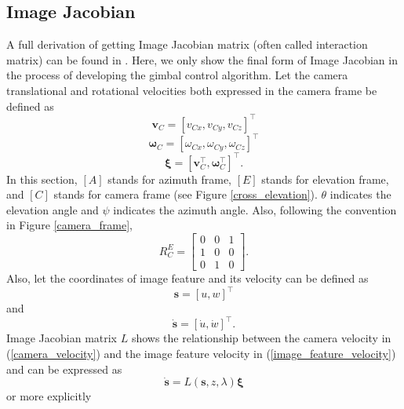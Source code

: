 \subsection{Image Jacobian}
A full derivation of getting Image Jacobian matrix (often called interaction matrix) can be found in \cite{spong2006robot}. Here, we only show the final form of Image Jacobian in the process of developing the gimbal control algorithm. Let the camera translational and rotational velocities both expressed in the camera frame be defined as
\begin{equation}
\mathbf{v}_C=[v_{Cx}, v_{Cy}, v_{Cz}]^\top
\end{equation}
\begin{equation}
\mathbf{\omega}_C=[\omega_{Cx}, \omega_{Cy}, \omega_{Cz}]^\top
\end{equation}
\begin{equation}
\mathbf{\xi}=[\mathbf{v}_C^\top, \mathbf{\omega}_C^\top]^\top.
\label{camera_velocity}
\end{equation}
In this section, $[A]$ stands for azimuth frame, $[E]$ stands for elevation frame, and $[C]$ stands for camera frame (see Figure \ref{cross_elevation}). $\theta$ indicates the elevation angle and $\psi$ indicates the azimuth angle. Also, following the convention in Figure \ref{camera_frame}, 
\begin{equation}
R^{E}_C =
\begin{bmatrix}
0 & 0 & 1 \\
1 & 0 & 0 \\
0 & 1 & 0
\end{bmatrix}.
\end{equation}
Also, let the coordinates of image feature and its velocity can be defined as 
\begin{equation}
\mathbf{s}=[u, w]^\top
\end{equation}
and 
\begin{equation}
\mathbf{\dot{s}}=[\dot{u}, \dot{w}]^\top.
\label{image_feature_velocity}
\end{equation}
Image Jacobian matrix $L$ shows the relationship between the camera velocity in (\ref{camera_velocity}) and the image feature velocity in (\ref{image_feature_velocity}) and can be expressed as 
\begin{equation}
\mathbf{\dot{s}}=L(\mathbf{s},z,\lambda)\mathbf{\xi}
\end{equation}
or more explicitly
